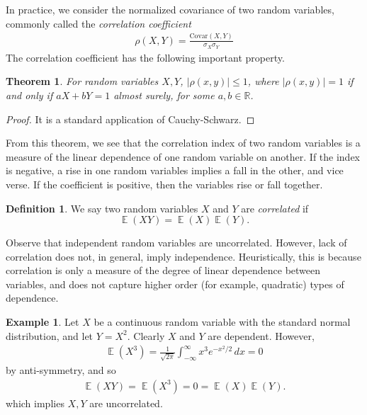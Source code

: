 \documentclass[12pt]{amsbook}
\newcommand{\rr}{\mathbb{R}}
\DeclareMathOperator{\ex}{\mathbb{E}}
\newcommand{\covar}{\mathrm{Covar}}
\theoremstyle{plain}
\newtheorem{theorem}{Theorem}
\theoremstyle{definition}
\newtheorem*{definition}{Definition}
\newtheorem*{example}{Example}
\theoremstyle{remark}
\numberwithin{equation}{section}  %
\numberwithin{equation}{section}  %
\begin{document}
	In practice, we consider the normalized covariance of two random variables,
	commonly called the \emph{correlation coefficient}
	\begin{align*}
		\rho(X,Y) = \frac{\covar(X,Y)}{\sigma_X \sigma_Y}
	\end{align*}
	The correlation coefficient has the following important property.
	\begin{theorem}
		For random variables $X, Y$, $|\rho(x,y)| \le 1$, where $|\rho(x,y)| = 1$ 
		if and
		only if $aX + bY = 1$ almost surely, for some $a,b \in \rr$. 
	\end{theorem}
	\begin{proof}
		It is a standard application of Cauchy-Schwarz.
	\end{proof}
	From this theorem, we see that the correlation index of two random variables is
	a measure of the linear dependence of one random variable on another. If the
	index is negative, a rise in one random variables implies a fall in the other,
	and vice verse. If the coefficient is positive, then the variables rise or fall
	together.
	\begin{definition}
		We say two random variables $X$ and $Y$ are \emph{correlated} 
		if \[\ex(XY) = \ex(X)\ex(Y).\]
	\end{definition}
	Observe that independent random variables are uncorrelated. However,
	lack of correlation does not, in general, imply independence. Heuristically, 
	this is
	because correlation is only a measure of the degree of linear dependence
	between variables, and does not capture higher order (for example, quadratic)
	types of dependence. 
	\begin{example}
		Let $X$ be a continuous random variable with the standard normal 
		distribution,
		and let $Y = X^2$. Clearly $X$ and $Y$ are dependent. However,
		\begin{align*}
			\ex(X^3) = \frac{1}{\sqrt{2 \pi}}\int_{-\infty}^{\infty} x^3 e^{-x^2/2} 
			\, dx = 0
		\end{align*}
		by anti-symmetry, and so
		\begin{align*}
			\ex(XY) = \ex(X^3) = 0 = \ex(X) \ex(Y).
		\end{align*}
		which implies $X, Y$ are uncorrelated.
	\end{example}
\end{document}
